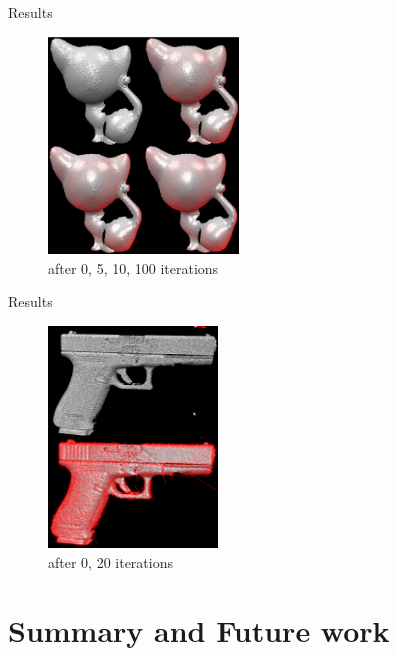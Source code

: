 \documentclass{beamer}
\begin{document}
\begin{frame}{Results}
\begin{figure}[htb]
\centering
\includegraphics[width=0.45\textwidth]{kitten0_5_10_100.PNG}
\caption{after 0, 5, 10, 100 iterations}
\label{fig:prescribed}
\end{figure}
\end{frame}

\begin{frame}{Results}
\begin{figure}[htb]
\centering
\includegraphics[width=0.4\textwidth]{gun_raw_20it.PNG}
\caption{after 0, 20 iterations}
\label{fig:prescribed}
\end{figure}
\end{frame}

\section{Summary and Future work}
\end{document}
